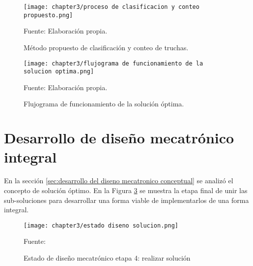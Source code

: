 \begin{landscape}
	\begin{figure}[H]
		\centering
		\texttt{[image: chapter3/proceso de clasificacion y conteo propuesto.png]}
		\caption{Método propuesto de clasificación y conteo de truchas.}%
		\begin{myflushleftportland}
			Fuente: Elaboración propia.
		\end{myflushleftportland}
		\label{fig:proceso de clasificacion y conteo propuesto}
	\end{figure}
\end{landscape}

\begin{landscape}
	\begin{figure}[H]
		\centering
		\texttt{[image: chapter3/flujograma de funcionamiento de la solucion optima.png]}
		\caption{Flujograma de funcionamiento de la solución óptima.}
		\begin{myflushleftportland}
			Fuente: Elaboración propia.
		\end{myflushleftportland}
		\label{fig:flujograma de funcionamiento de la solucion optima}
	\end{figure}
\end{landscape}








\newpage
\pagestyle{myportland}

\section{Desarrollo de diseño mecatrónico integral}

En la sección \ref{sec:desarrollo del diseno mecatronico conceptual} se analizó el concepto de solución óptimo. En la Figura \ref{fig:estado diseno mecatronico etapa 4} se muestra la etapa final de unir las sub-soluciones para desarrollar una forma viable de implementarlos de una forma integral.

\begin{figure}[H]
	\centering
	\texttt{[image: chapter3/estado diseno solucion.png]}
	\caption{Estado de diseño mecatrónico etapa 4: realizar solución}
	\begin{myflushleftportland}
		Fuente: \cite{Pahl2007}
	\end{myflushleftportland}
	\label{fig:estado diseno mecatronico etapa 4}
\end{figure}

